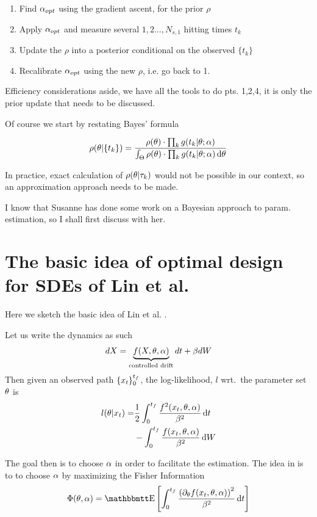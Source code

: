\documentclass{article}
\begin{document}
\begin{enumerate}
  \item Find ${{\alpha}_{opt} }$ using the gradient ascent, for the prior $\rho$
  \item Apply ${{\alpha}_{opt} }$ and measure several $1,2\ldots,N_{s,1}$ hitting times
  $t_k$
  \item Update the $\rho$ into a posterior conditional on the observed $\{t_k\}$
  \item Recalibrate ${{\alpha}_{opt} }$ using the new $\rho$, i.e. go back to 1. 
\end{enumerate}

 Efficiency considerations aside, we have all the tools to do pts. 1,2,4, it
 is only the prior update that needs to be discussed. 

Of course we start by restating Bayes' formula

$$
\rho({\theta}| \{t_k\} ) = 
\frac{  \rho({\theta}) \cdot \prod_k g(t_k|{\theta} ; {\alpha}) }
	 { \int_{\Theta}  \rho({\theta}) \cdot \prod_k g(t_k|{\theta} ; {\alpha})  \, \mathrm{d} {\theta}}
$$

In practice, exact calculation of $\rho({\theta}|{\tau}_k)$ would not be possible in our
context, so an approximation approach needs to be made.

I know that Susanne has done some work on a Bayesian approach to param.
estimation, so I shall first discuss with her. 

\clearpage
\appendix
\section{The basic idea of optimal design for SDEs of Lin et al.}
Here we sketch the basic idea of Lin et al. \cite{Lin}. 

Let us write the dynamics as such
\begin{equation}
dX = \underbrace{f(X,{\theta}, {\alpha})}_{\textrm{controlled drift}}dt
+ {\beta} dW
\end{equation}
Then given an observed path $\{x_t\}_0^{ t_f }$, the log-likelihood, $l$ wrt.\ the
parameter set ${\theta}$ is
\begin{align}
l({\theta} | x_t) =&  \frac 12 \int_0^{ t_f } \frac{f^2(x_t,{\theta}, {\alpha})}{{\beta}^2} \, \mathrm{d} t
\notag
\\
&- \int_0^{ t_f }  \frac{f(x_t,{\theta}, {\alpha})}{{\beta}^2} \, \mathrm{d} W
\label{eq:log_likelihood_cts_time}
\end{align}

The goal then is to choose ${\alpha}$ in order to facilitate the estimation. The idea
in \cite{Lin} is to to choose ${\alpha}$ by maximizing the Fisher Information
\begin{equation}
\FI(\th, \a) = \Exp \left[ \int_0^\tf \frac{ \left( \di_\th f(x_t,\th, \a)
\right)^2}{\b^2}
\intd{t}
\right]
\label{eq:Fisher_Information}
\end{equation}
\end{document}
